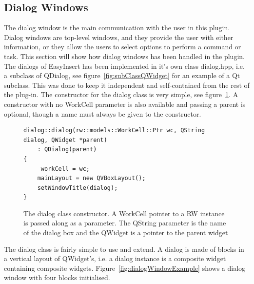 \subsection{Dialog Windows}
\label{sec:DialogWindows}
The dialog window is the main communication with the user in this plugin. Dialog windows are top-level windows, and they provide the user with either information, or they allow the users to select options to perform a command or task. This section will show how dialog windows has been handled in the plugin.\\

The dialogs of EasyInsert has been implemented in it's own class dialog.hpp, i.e. a subclass of QDialog, see figure~\ref{fig:subClassQWidget} for an example of a Qt subclass. This was done to keep it independent and self-contained from the rest of the plug-in. The constructor for the dialog class is very simple, see figure~\ref{fig:dialogConstructor}. A constructor with no WorkCell parameter is also available and passing a parent is optional, though a name must always be given to the constructor. 

\begin{figure}[h] %
\centering
\lstset{language=C++} 
\begin{lstlisting}[frame=single]  
dialog::dialog(rw::models::WorkCell::Ptr wc, QString dialog, QWidget *parent)
    : QDialog(parent)
{
    _workCell = wc;
    mainLayout = new QVBoxLayout();
    setWindowTitle(dialog);
}			 
\end{lstlisting}
\caption{The dialog class constructor. A WorkCell pointer to a RW instance is passed along as a parameter. The QString parameter is the name of the dialog box and the QWidget is a pointer to the parent widget }
\label{fig:dialogConstructor} 	
\end{figure}

The dialog class is fairly simple to use and extend. A dialog is made of blocks in a vertical layout of QWidget's, i.e. a dialog instance is a composite widget containing composite widgets. Figure~\ref{fig:dialogWindowExample} shows a dialog window with four blocks initialised.

